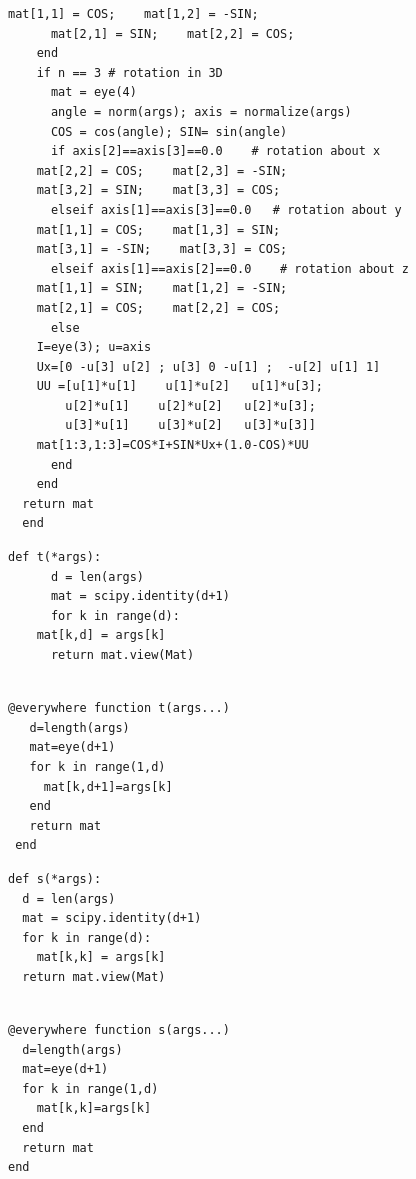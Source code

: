\documentclass[a4paper,12pt]{article}
\begin{document}
\begin{multicols}{2}
\begin{Verbatim}[fontsize=\scriptsize]
      mat[1,1] = COS;    mat[1,2] = -SIN;
      mat[2,1] = SIN;    mat[2,2] = COS;
    end
    if n == 3 # rotation in 3D
      mat = eye(4)
      angle = norm(args); axis = normalize(args)
      COS = cos(angle); SIN= sin(angle)
      if axis[2]==axis[3]==0.0    # rotation about x
	mat[2,2] = COS;    mat[2,3] = -SIN;
	mat[3,2] = SIN;    mat[3,3] = COS;
      elseif axis[1]==axis[3]==0.0   # rotation about y
	mat[1,1] = COS;    mat[1,3] = SIN;
	mat[3,1] = -SIN;    mat[3,3] = COS;
      elseif axis[1]==axis[2]==0.0    # rotation about z
	mat[1,1] = SIN;    mat[1,2] = -SIN;
	mat[2,1] = COS;    mat[2,2] = COS;
      else
	I=eye(3); u=axis
	Ux=[0 -u[3] u[2] ; u[3] 0 -u[1] ;  -u[2] u[1] 1]
	UU =[u[1]*u[1]    u[1]*u[2]   u[1]*u[3];
	    u[2]*u[1]    u[2]*u[2]   u[2]*u[3];
	    u[3]*u[1]    u[3]*u[2]   u[3]*u[3]]
	mat[1:3,1:3]=COS*I+SIN*Ux+(1.0-COS)*UU
      end
    end
  return mat
  end
\end{Verbatim}
\end{multicols}
\begin{multicols}{2}
\begin{Verbatim}[fontsize=\scriptsize]
    def t(*args):
      d = len(args)
      mat = scipy.identity(d+1)
      for k in range(d):
	mat[k,d] = args[k]
      return mat.view(Mat)   
\end{Verbatim}
\columnbreak
{}
\begin{Verbatim}[fontsize=\scriptsize]

@everywhere function t(args...)
   d=length(args)
   mat=eye(d+1)
   for k in range(1,d)
     mat[k,d+1]=args[k]
   end
   return mat
 end

\end{Verbatim}
\end{multicols}
\noindent {}
\begin{multicols}{2}
\noindent {}
\begin{Verbatim}[fontsize=\scriptsize]
def s(*args):
  d = len(args)
  mat = scipy.identity(d+1)
  for k in range(d):
    mat[k,k] = args[k]
  return mat.view(Mat)
    
\end{Verbatim}
\columnbreak
{}
\begin{Verbatim}[fontsize=\scriptsize]
@everywhere function s(args...)
  d=length(args)
  mat=eye(d+1)
  for k in range(1,d)
    mat[k,k]=args[k]
  end
  return mat
end
\end{Verbatim}
\end{multicols}
\end{document}
